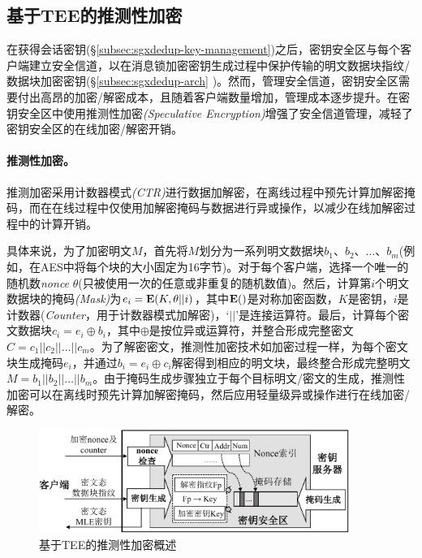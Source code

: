 \subsection{基于TEE的推测性加密}
\label{subsec:sgxdedup-encryption}

在获得会话密钥(\S\ref{subsec:sgxdedup-key-management})之后，密钥安全区与每个客户端建立安全信道，以在消息锁加密密钥生成过程中保护传输的明文数据块指纹/数据块加密密钥(\S\ref{subsec:sgxdedup-arch} )。然而，管理安全信道，密钥安全区需要付出高昂的加密/解密成本，且随着客户端数量增加，管理成本逐步提升。\sysnameS 在密钥安全区中使用推测性加密\textit{(Speculative Encryption)}\cite{eduardo2019Speculative}增强了安全信道管理，减轻了密钥安全区的在线加密/解密开销。

\paragraph*{推测性加密。}推测加密\cite{eduardo2019Speculative}采用计数器模式\textit{(CTR)}\cite{counter}进行数据加解密，在离线过程中预先计算加解密掩码，而在在线过程中仅使用加解密掩码与数据进行异或操作，以减少在线加解密过程中的计算开销。

具体来说，为了加密明文$M$，首先将$M$划分为一系列明文数据块$b_1、b_2、\ldots、b_m$(例如，在AES中将每个块的大小固定为16字节)。对于每个客户端，选择一个唯一的随机数\textit{nonce} $\theta$(只被使用一次的任意或非重复的随机数值)。然后，计算第$i$个明文数据块的掩码\textit{(Mask)}为$e_i = {\bf E}(K, \theta || i)$，其中${\bf E}()$是对称加密函数，$K$是密钥，$i$是计数器(\textit{Counter}，用于计数器模式加解密)，‘$||$’是连接运算符。最后，计算每个密文数据块$c_i = e_i \oplus b_i $，其中$\oplus$是按位异或运算符，并整合形成完整密文$C = c_1 || c_2 || \ldots || c_m$。为了解密密文，推测性加密技术如加密过程一样，为每个密文块生成掩码$e_i$，并通过$b_i = e_i \oplus c_i $解密得到相应的明文块，最终整合形成完整明文$M = b_1 || b_2 || \ldots || b_m$。由于掩码生成步骤独立于每个目标明文/密文的生成，推测性加密可以在离线时预先计算加解密掩码，然后应用轻量级异或操作进行在线加密/解密。

\begin{figure}[!htb]
    \centering
    \includegraphics[width=0.9\textwidth]{pic/sgxdedup/key-enclave-arch.pdf}
    \caption{基于TEE的推测性加密概述}
    \label{fig:sgxdedup-SpecEnc}
\end{figure}

